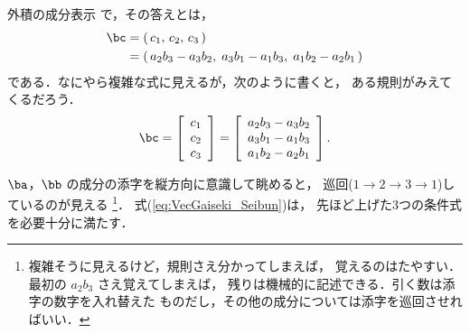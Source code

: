 \begin{mysmallsec}{外積の成分表示}
                で，その答えとは，
                    \begin{align*}
                        \bc &= (\,c_{1},\,c_{2},\,c_{3}\,) \\
                            &= (\,
                                    a_{2}b_{3} - a_{3}b_{2},\;
                                    a_{3}b_{1} - a_{1}b_{3},\;
                                    a_{1}b_{2} - a_{2}b_{1}
                                \,)
                    \end{align*}
                である．なにやら複雑な式に見えるが，次のように書くと，
                ある規則がみえてくるだろう．
                    \begin{align}\label{eq:VecGaiseki_Seibun}
                        \bc =
                        \left[
                            \begin{array}{c}
                                c_{1} \\
                                c_{2} \\
                                c_{3} \\
                            \end{array}
                        \right]
                        =
                        \left[
                            \begin{array}{c}
                                a_{2}b_{3} - a_{3}b_{2} \\
                                a_{3}b_{1} - a_{1}b_{3} \\
                                a_{1}b_{2} - a_{2}b_{1} \\
                            \end{array}
                        \right].
                    \end{align}

                $\ba$，$\bb$ の成分の添字を縦方向に意識して眺めると，
                巡回($1 \to 2 \to 3 \to 1$)しているのが見える
                    \footnote{
                        複雑そうに見えるけど，規則さえ分かってしまえば，
                        覚えるのはたやすい．最初の $a_{2}b_{3}$ さえ覚えてしまえば，
                        残りは機械的に記述できる．引く数は添字の数字を入れ替えた
                        ものだし，その他の成分については添字を巡回させればいい．
                    }．
                式(\ref{eq:VecGaiseki_Seibun})は，
                先ほど上げた3つの条件式を必要十分に満たす．
            \end{mysmallsec}

